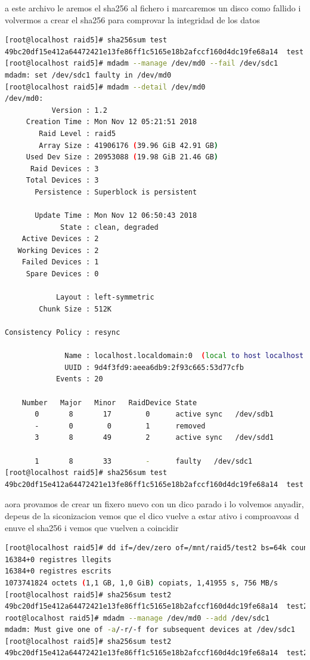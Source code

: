 \documentclass[preprint,11pt]{elsarticle}
\begin{document}
a este archivo le aremos el sha256 al fichero i marcaremos un disco como fallido i volvermos a crear el sha256 para comprovar la integridad de los datos 
\begin{lstlisting}[basicstyle=\tiny, language=bash]
[root@localhost raid5]# sha256sum test 
49bc20df15e412a64472421e13fe86ff1c5165e18b2afccf160d4dc19fe68a14  test
[root@localhost raid5]# mdadm --manage /dev/md0 --fail /dev/sdc1 
mdadm: set /dev/sdc1 faulty in /dev/md0
[root@localhost raid5]# mdadm --detail /dev/md0
/dev/md0:
           Version : 1.2
     Creation Time : Mon Nov 12 05:21:51 2018
        Raid Level : raid5
        Array Size : 41906176 (39.96 GiB 42.91 GB)
     Used Dev Size : 20953088 (19.98 GiB 21.46 GB)
      Raid Devices : 3
     Total Devices : 3
       Persistence : Superblock is persistent

       Update Time : Mon Nov 12 06:50:43 2018
             State : clean, degraded 
    Active Devices : 2
   Working Devices : 2
    Failed Devices : 1
     Spare Devices : 0

            Layout : left-symmetric
        Chunk Size : 512K

Consistency Policy : resync

              Name : localhost.localdomain:0  (local to host localhost.localdomain)
              UUID : 9d4f3fd9:aeea6db9:2f93c665:53d77cfb
            Events : 20

    Number   Major   Minor   RaidDevice State
       0       8       17        0      active sync   /dev/sdb1
       -       0        0        1      removed
       3       8       49        2      active sync   /dev/sdd1

       1       8       33        -      faulty   /dev/sdc1
[root@localhost raid5]# sha256sum test 
49bc20df15e412a64472421e13fe86ff1c5165e18b2afccf160d4dc19fe68a14  test
\end{lstlisting}
aora provamos de crear un fixero nuevo con un dico parado i lo volvemos anyadir, depeus de la siconizacion vemos que el dico vuelve a estar ativo i comproavoas d enuve el sha256 i vemos que vuelven a coincidir 

\begin{lstlisting}[basicstyle=\tiny, language=bash]
[root@localhost raid5]# dd if=/dev/zero of=/mnt/raid5/test2 bs=64k count=16k conv=fdatasync
16384+0 registres llegits
16384+0 registres escrits
1073741824 octets (1,1 GB, 1,0 GiB) copiats, 1,41955 s, 756 MB/s
[root@localhost raid5]# sha256sum test2 
49bc20df15e412a64472421e13fe86ff1c5165e18b2afccf160d4dc19fe68a14  test2
root@localhost raid5]# mdadm --manage /dev/md0 --add /dev/sdc1 
mdadm: Must give one of -a/-r/-f for subsequent devices at /dev/sdc1
[root@localhost raid5]# sha256sum test2 
49bc20df15e412a64472421e13fe86ff1c5165e18b2afccf160d4dc19fe68a14  test2
\end{lstlisting}
\end{document}
